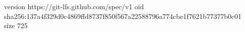 version https://git-lfs.github.com/spec/v1
oid sha256:137a4f329d0c4869ffd8737f850f567a22588796a774cbe1f7621b77377b0c01
size 725
